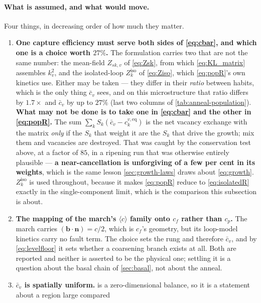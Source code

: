 \documentclass{article}
\newcommand{\cloop}{\ensuremath{\langle c\rangle}}
\newcommand{\bvec}{\bm b}
\newcommand{\nvec}{\bm n}
\begin{document}
\paragraph{What is assumed, and what would move.} Four things, in decreasing
order of how much they matter.
\begin{enumerate}
\item \textbf{One capture efficiency must serve both sides of \cref{eq:cbar}, and
      which one is a choice worth $27\%$.} The formulation carries two that are
      not the same number: the mean-field $Z_{sk,v}$ of \cref{eq:Zsk}, from which
      \cref{eq:KL_matrix} assembles $k^2_v$, and the isolated-loop
      $Z^{\mathrm{iso}}_k$ of \cref{eq:Ziso}, which \cref{eq:popR}'s own kinetics
      use. Either may be taken --- they differ in their \emph{ratio} between
      habits, which is the only thing $\bar c_v$ sees, and on this microstructure
      that ratio differs by $1.7\times$ and $\bar c_v$ by up to $27\%$ (last two
      columns of \cref{tab:anneal-population}). \textbf{What may not be done is to
      take one in \cref{eq:cbar} and the other in \cref{eq:popR}.} The sum
      $\sum_k S_k(\bar c_v-c^{v,\mathrm{eq}}_k)$ is the net vacancy exchange with
      the matrix \emph{only} if the $S_k$ that weight it are the $S_k$ that drive
      the growth; mix them and vacancies are destroyed. That was caught by the
      conservation test above, at a factor of $85$, in a ripening run that was
      otherwise entirely plausible --- \textbf{a near-cancellation is unforgiving
      of a few per cent in its weights}, which is the same lesson
      \cref{sec:growth-laws} draws about \cref{eq:growth}. $Z^{\mathrm{iso}}_k$ is
      used throughout, because it makes \cref{eq:popR} reduce to
      \cref{eq:isolatedR} exactly in the single-component limit, which is the
      comparison this subsection is about.
\item \textbf{The mapping of the march's \cloop{} family onto $c_f$ rather than
      $c_p$.} The march carries $(\bvec\!\cdot\!\nvec)=c/2$, which is $c_f$'s
      geometry, but its loop-model kinetics carry no fault term. The choice sets
      the rung and therefore $\bar c_v$, and by \cref{eq:levelfloor} it sets
      whether a coarsening branch exists at all. Both are reported and neither is
      asserted to be the physical one; settling it is a question about the basal
      chain of \cref{sec:basal}, not about the anneal.
\item \textbf{$\bar c_v$ is spatially uniform.}  is a
      zero-dimensional balance, so it is a statement about a region large compared

\end{enumerate}
\end{document}
